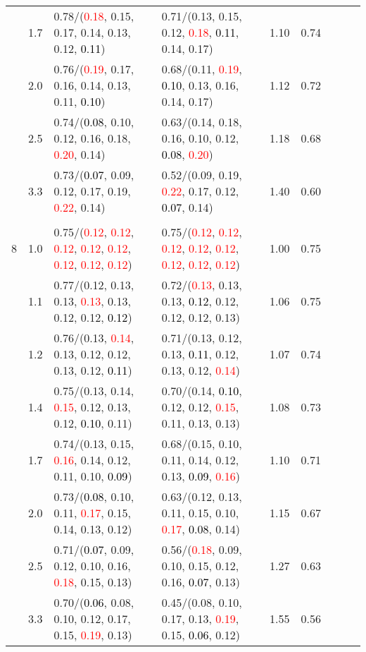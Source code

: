 \documentclass[10pt,a4paper]{report}
\begin{document}
\begin{table}[!htbp]
\begin{center}
{\begin{tabular}{ccllccccc}
			&1.7&0.78/(\textcolor{red}{0.18}, 0.15, 0.17, 0.14, 0.13, 0.12, \textcolor{black}{0.11})&0.71/(0.13, 0.15, 0.12, \textcolor{red}{0.18}, \textcolor{black}{0.11}, 0.14, 0.17)&1.10&0.74\\
			&2.0&0.76/(\textcolor{red}{0.19}, 0.17, 0.16, 0.14, 0.13, 0.11, \textcolor{black}{0.10})&0.68/(0.11, \textcolor{red}{0.19}, \textcolor{black}{0.10}, 0.13, 0.16, 0.14, 0.17)&1.12&0.72\\
			&2.5&0.74/(\textcolor{black}{0.08}, 0.10, 0.12, 0.16, 0.18, \textcolor{red}{0.20}, 0.14)&0.63/(0.14, 0.18, 0.16, 0.10, 0.12, \textcolor{black}{0.08}, \textcolor{red}{0.20})&1.18&0.68\\
			&3.3&0.73/(\textcolor{black}{0.07}, 0.09, 0.12, 0.17, 0.19, \textcolor{red}{0.22}, 0.14)&0.52/(0.09, 0.19, \textcolor{red}{0.22}, 0.17, 0.12, \textcolor{black}{0.07}, 0.14)&1.40&0.60\\
			&&&&\\
			8			&1.0&0.75/(\textcolor{red}{0.12}, \textcolor{red}{0.12}, \textcolor{red}{0.12}, \textcolor{red}{0.12}, \textcolor{red}{0.12}, \textcolor{red}{0.12}, \textcolor{red}{0.12}, \textcolor{red}{0.12})&0.75/(\textcolor{red}{0.12}, \textcolor{red}{0.12}, \textcolor{red}{0.12}, \textcolor{red}{0.12}, \textcolor{red}{0.12}, \textcolor{red}{0.12}, \textcolor{red}{0.12}, \textcolor{red}{0.12})&1.00&0.75\\
			&1.1&0.77/(0.12, 0.13, 0.13, \textcolor{red}{0.13}, 0.13, 0.12, 0.12, \textcolor{black}{0.12})&0.72/(\textcolor{red}{0.13}, 0.13, 0.13, \textcolor{black}{0.12}, 0.12, 0.12, 0.12, 0.13)&1.06&0.75\\
			&1.2&0.76/(0.13, \textcolor{red}{0.14}, 0.13, 0.12, 0.12, 0.13, 0.12, \textcolor{black}{0.11})&0.71/(0.13, 0.12, 0.13, \textcolor{black}{0.11}, 0.12, 0.13, 0.12, \textcolor{red}{0.14})&1.07&0.74\\
			&1.4&0.75/(0.13, 0.14, \textcolor{red}{0.15}, 0.12, 0.13, 0.12, \textcolor{black}{0.10}, 0.11)&0.70/(0.14, \textcolor{black}{0.10}, 0.12, 0.12, \textcolor{red}{0.15}, 0.11, 0.13, 0.13)&1.08&0.73\\
			&1.7&0.74/(0.13, 0.15, \textcolor{red}{0.16}, 0.14, 0.12, 0.11, 0.10, \textcolor{black}{0.09})&0.68/(0.15, 0.10, 0.11, 0.14, 0.12, 0.13, \textcolor{black}{0.09}, \textcolor{red}{0.16})&1.10&0.71\\
			&2.0&0.73/(\textcolor{black}{0.08}, 0.10, 0.11, \textcolor{red}{0.17}, 0.15, 0.14, 0.13, 0.12)&0.63/(0.12, 0.13, 0.11, 0.15, 0.10, \textcolor{red}{0.17}, \textcolor{black}{0.08}, 0.14)&1.15&0.67\\
			&2.5&0.71/(\textcolor{black}{0.07}, 0.09, 0.12, 0.10, 0.16, \textcolor{red}{0.18}, 0.15, 0.13)&0.56/(\textcolor{red}{0.18}, 0.09, 0.10, 0.15, 0.12, 0.16, \textcolor{black}{0.07}, 0.13)&1.27&0.63\\
			&3.3&0.70/(\textcolor{black}{0.06}, 0.08, 0.10, 0.12, 0.17, 0.15, \textcolor{red}{0.19}, 0.13)&0.45/(0.08, 0.10, 0.17, 0.13, \textcolor{red}{0.19}, 0.15, \textcolor{black}{0.06}, 0.12)&1.55&0.56\\
			\bottomrule
		\end{tabular}}
	\end{center}
\end{table}
\end{document}
